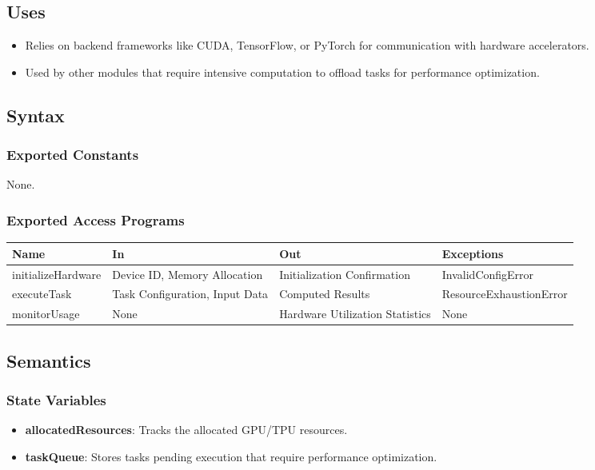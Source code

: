 \documentclass[12pt, titlepage]{article}
\begin{document}
\subsection{Uses}
\begin{itemize}
    \item Relies on backend frameworks like CUDA, TensorFlow, or PyTorch for communication with hardware accelerators.
    \item Used by other modules that require intensive computation to offload tasks for performance optimization.
\end{itemize}

\subsection{Syntax}

\subsubsection{Exported Constants}
None.

\subsubsection{Exported Access Programs}

\begin{center}
  \begin{tabular}{p{3cm} p{4cm} p{4cm} p{5cm}}
    \hline
    \textbf{Name} & \textbf{In} & \textbf{Out} & \textbf{Exceptions} \\
    \hline
    initializeHardware & Device ID, Memory Allocation & Initialization Confirmation & InvalidConfigError \\
    \hline
    executeTask & Task Configuration, Input Data & Computed Results & ResourceExhaustionError \\
    \hline
    monitorUsage & None & Hardware Utilization Statistics & None \\
    \hline
  \end{tabular}
\end{center}

\subsection{Semantics}

\subsubsection{State Variables}
\begin{itemize}
    \item \textbf{allocatedResources}: Tracks the allocated GPU/TPU resources.
    \item \textbf{taskQueue}: Stores tasks pending execution that require performance optimization.
\end{itemize}
\end{document}
